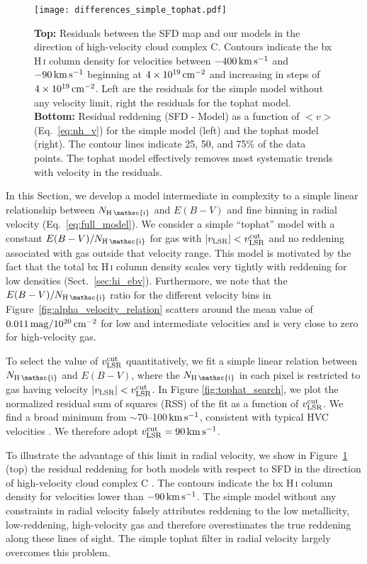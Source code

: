 \documentclass[iop,apj]{emulateapj}
\makeatletter
\def\testbx{bx}%
\DeclareRobustCommand{\ion}[2]{%
\relax\ifmmode
\ifx\testbx\f@series
{\mathbf{#1\,\mathsc{#2}}}\else
{\mathrm{#1\,\mathsc{#2}}}\fi
\else\textup{#1\,{\mdseries\textsc{#2}}}%
\fi}
\makeatother
\begin{document}
\begin{figure*}[tp]
	\texttt{[image: differences\_simple\_tophat.pdf]}
    \caption{\textbf{Top:} Residuals between the SFD map and our models in the direction of high-velocity cloud complex C. Contours indicate the \ion{H}{i} column density for velocities between $-400\,\rm km\,s^{-1}$ and $-90\,\rm km\,s^{-1}$ beginning at $4\times 10^{19}\,\rm cm^{-2}$ and increasing in steps of $4\times 10^{19}\,\rm cm^{-2}$. Left are the residuals for the simple model without any velocity limit, right the residuals for the tophat model. \textbf{Bottom:} Residual reddening (SFD - Model) as a function of $<v>$ (Eq.~\ref{eq:nh_v}) for the simple model (left) and the tophat model (right). The contour lines indicate 25, 50, and 75\% of the data points. The tophat model effectively removes most systematic trends with velocity in the residuals.}
    \label{fig:differences_simple_tophat}
\end{figure*}

In this Section, we develop a model intermediate in complexity to a simple linear relationship between $N_\ion{H}{i}$ and $E(B-V)$ and fine binning in radial velocity (Eq.~\ref{eq:full_model}). We consider a simple ``tophat'' model with a constant $E(B-V)/N_\ion{H}{i}$ for gas with $|v_{\rm LSR}| < v_{\rm LSR}^{\rm cut}$ and no reddening associated with gas outside that velocity range. This model is motivated by the fact that the total \ion{H}{i} column density scales very tightly with reddening for low densities (Sect.~\ref{sec:hi_ebv}). Furthermore, we note that the $E(B-V)/N_{\ion{H}{i}}$ ratio for the different velocity bins in Figure~\ref{fig:alpha_velocity_relation} scatters around the mean value of $0.011\,\rm mag/10^{20}\,cm^{-2}$ for low and intermediate velocities and is very close to zero for high-velocity gas. 

To select the value of $v_{\rm LSR}^{\rm cut}$ quantitatively, we fit a simple linear relation between $N_\ion{H}{i}$ and $E(B-V)$, where the $N_\ion{H}{i}$ in each pixel is restricted to gas having velocity $|v_{\rm LSR}| < v_{\rm LSR}^{\rm cut}$. In Figure \ref{fig:tophat_search}, we plot the normalized residual sum of squares (RSS) of the fit as a function of $v_{\rm LSR}^{\rm cut}$. We find a broad minimum from $\sim$70--100\,$\rm km\,s^{-1}$, consistent with typical HVC velocities \citep{Wakker+vanWoerden_1997}. We therefore adopt $v_{\rm LSR}^{\rm cut} = 90\,\rm km\,s^{-1}$.

To illustrate the advantage of this limit in radial velocity, we show in Figure~\ref{fig:differences_simple_tophat} (top) the residual reddening for both models with respect to SFD in the direction of high-velocity cloud complex C \citep[e.g.][]{Fox+etal_2003, Wakker+etal_2007, Fraternali+etal_2015}. The contours indicate the \ion{H}{i} column density for velocities lower than $-90\,\rm km\,s^{-1}$. The simple model without any constraints in radial velocity falsely attributes reddening to the low metallicity, low-reddening, high-velocity gas and therefore overestimates the true reddening along these lines of sight. The simple tophat filter in radial velocity largely overcomes this problem.
\end{document}
